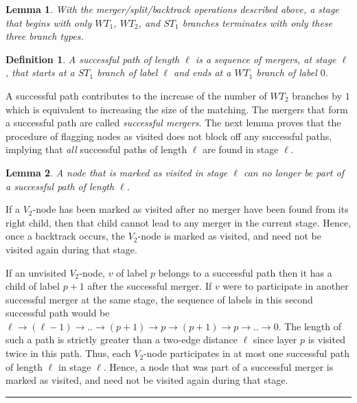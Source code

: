 \documentclass{article}
\newtheorem{lemma}{Lemma}[section]
\newtheorem{definition}{Definition}[section]
\newenvironment{proof}[1][Proof:]{\begin{trivlist}
\item[\hskip \labelsep {\bfseries #1}]}{\end{trivlist}}
\newcommand{\qed}{\hfill \rule{2.5mm}{2.5mm}}
\begin{document}
\begin{lemma}
\label{property:threeTypes}
With the merger/split/backtrack operations described above, a stage that begins with only $WT_1$, $WT_2$, and $ST_1$ branches terminates with only these three branch types.
\end{lemma}

\begin{definition}
A {\em successful} path of length $\ell$ is a sequence of mergers, at stage $\ell$, that starts at a $ST_1$ branch of label $\ell$ and ends at a $WT_1$ branch of label $0$.
\end{definition}

A successful path  contributes to the increase of the number of $WT_2$ branches by $1$ which is equivalent to increasing the size of the matching. The mergers that form a successful path are called {\em successful mergers}. The next lemma proves that the procedure of flagging nodes as visited does not block off any successful paths, implying that {\em all} successful paths of length $\ell$ are found in stage $\ell$.

\begin{lemma}
\label{lem:visited} A node that is marked as visited in stage $\ell$ can no longer be part of a successful path of length $\ell$.
\end{lemma}
\begin{proof}
If a $V_2$-node has been marked as visited after no merger have been found from its right child, then that child cannot lead to any merger in the current stage.  Hence, once a backtrack occurs, the $V_2$-node is marked as visited, and need not be visited again during that stage.

If an unvisited $V_2$-node, $v$ of label $p$ belongs to a successful path then it has a child of label $p+1$ after the successful merger. If $v$ were to participate in another successful merger at the same stage, the sequence of labels in this second successful path would be $\ell \rightarrow (\ell-1) \rightarrow .. \rightarrow (p+1) \rightarrow p \rightarrow (p+1) \rightarrow p \rightarrow .. \rightarrow 0$. The length of such a path is strictly greater than a two-edge distance $\ell$ since layer $p$ is visited twice in this path. Thus, each $V_2$-node participates in at most one successful path of length $\ell$ in stage $\ell$. Hence, a node that was part of a successful merger is marked as visited, and need not be visited again during that stage. \qed
\end{proof}
\end{document}
